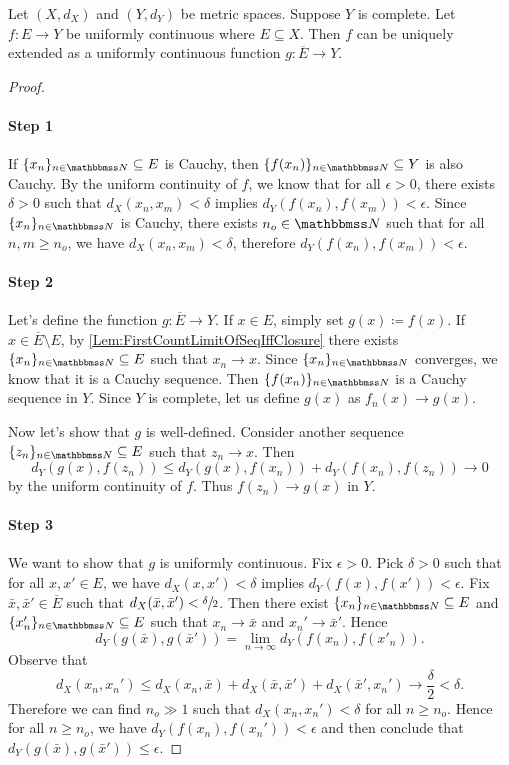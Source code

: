 \documentclass[screen,single]{techreport}
\numberwithin{equation}{section}
\begin{document}
\begin{theorem}\label{The:UnifContToCompleteCanBeExtended}
  Let $(X,d_X)$ and $(Y,d_Y)$ be metric spaces.
  Suppose $Y$ is complete.
  Let $f : E \to Y$ be uniformly continuous where $E \subseteq X$.
  Then $f$ can be uniquely extended as a uniformly continuous function $g : \overline{E} \to Y$.
\end{theorem}
\begin{proof}\
  \paragraph{Step 1}
  If $\{x_n\}_{n \in \bbN} \subseteq E$ is Cauchy, then $\{f(x_n)\}_{n \in \bbN} \subseteq Y$ is also Cauchy.
  By the uniform continuity of $f$, we know that for all $\epsilon > 0$, there exists $\delta > 0$ such that $d_X(x_n,x_m) < \delta$ implies $d_Y(f(x_n),f(x_m)) < \epsilon$.
  Since $\{x_n\}_{n \in \bbN}$ is Cauchy, there exists $n_o \in \bbN$ such that for all $n,m \ge n_o$, we have $d_X(x_n,x_m) < \delta$, therefore $d_Y(f(x_n),f(x_m)) < \epsilon$.
  
  \paragraph{Step 2} Let's define the function $g : \overline{E} \to Y$.
  If $x \in E$, simply set $g(x) \coloneqq f(x)$.
  If $x \in \overline{E} \setminus E$, by \cref{Lem:FirstCountLimitOfSeqIffClosure} there exists $\{x_n\}_{n \in \bbN} \subseteq E$ such that $x_n \rightarrow x$.
  Since $\{x_n\}_{n \in \bbN}$ converges, we know that it is a Cauchy sequence.
  Then $\{f(x_n)\}_{n \in \bbN}$ is a Cauchy sequence in $Y$.
  Since $Y$ is complete, let us define $g(x)$ as $f_n(x) \rightarrow g(x)$.
  
  Now let's show that $g$ is well-defined.
  Consider another sequence $\{z_n\}_{n \in \bbN} \subseteq E$ such that $z_n \rightarrow x$.
  Then
  \[
  d_Y(g(x), f(z_n)) \le d_Y(g(x), f(x_n)) + d_Y(f(x_n), f(z_n)) \rightarrow 0
  \]
  by the uniform continuity of $f$.
  Thus $f(z_n) \rightarrow g(x)$ in $Y$.
  
  \paragraph{Step 3}
  We want to show that $g$ is uniformly continuous.
  Fix $\epsilon > 0$.
  Pick $\delta > 0$ such that for all $x,x' \in E$, we have $d_X(x,x') < \delta$ implies $d_Y(f(x),f(x')) < \epsilon$.
  Fix $\bar{x}, \bar{x}' \in \overline{E}$ such that $d_X(\bar{x},\bar{x}') < \sfrac{\delta}{2}$.
  Then there exist $\{x_n\}_{n \in \bbN} \subseteq E$ and $\{x_n'\}_{n \in \bbN} \subseteq E$ such that $x_n \rightarrow \bar{x}$ and $x_n' \rightarrow \bar{x}'$.
  Hence
  \[
    d_Y(g(\bar{x}), g(\bar{x}'))  = \lim_{n \to \infty} d_Y(f(x_n), f(x'_n)).
  \]
  Observe that
  \[
  d_X(x_n,x_n') \le d_X(x_n,\bar{x}) + d_X(\bar{x}, \bar{x}') + d_X(\bar{x}',x_n') \rightarrow \frac{\delta}{2} < \delta.
  \]
  Therefore we can find $n_o \gg 1$ such that $d_X(x_n,x_n') < \delta$ for all $n \ge n_o$.
  Hence for all $n \ge n_o$, we have $d_Y(f(x_n), f(x_n')) < \epsilon$ and then conclude that $d_Y(g(\bar{x}), g(\bar{x}')) \le \epsilon$.
\end{proof}
\end{document}
